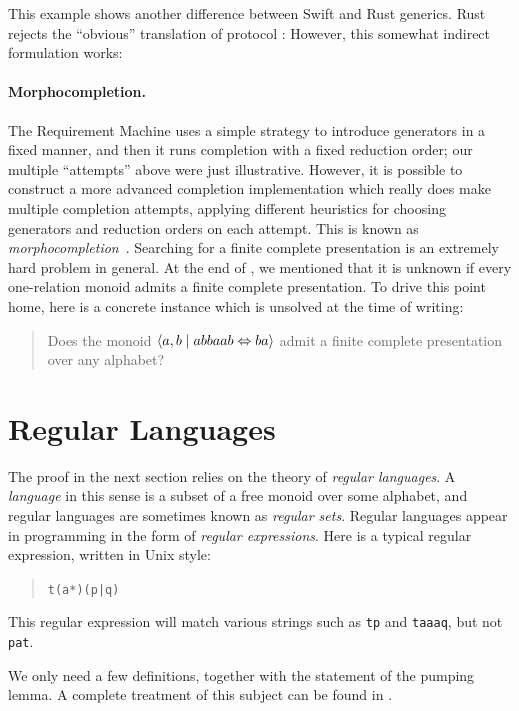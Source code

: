 \documentclass[../generics]{subfiles}
\begin{document}
\begin{example}
This example shows another difference between Swift and Rust generics. Rust rejects the ``obvious'' translation of protocol \tO:
However, this somewhat indirect formulation works:
\end{example}

\paragraph{Morphocompletion.}
The Requirement Machine uses a simple strategy to introduce generators in a fixed manner, and then it runs completion with a fixed reduction order; our multiple ``attempts'' above were just illustrative. However, it is possible to construct a more advanced completion implementation which really does make multiple completion attempts, applying different heuristics for choosing generators and reduction orders on each attempt. This is known as \emph{morphocompletion}~\cite{morph}. Searching for a finite complete presentation is an extremely hard problem in general. At the end of , we mentioned that it is unknown if every one-relation monoid admits a finite complete presentation. To drive this point home, here is a concrete instance which is unsolved at the time of writing:
\begin{quote}
Does the monoid $\langle a,b \mid abbaab \Leftrightarrow ba\rangle$ admit a finite complete presentation over any alphabet?
\end{quote}

\section{Regular Languages}\label{sec:regular languages}

The proof in the next section relies on the theory of \emph{regular languages}. A \emph{language} in this sense is a subset of a free monoid over some alphabet, and regular languages are sometimes known as \emph{regular sets}. Regular languages appear in programming in the form of \emph{regular expressions}. Here is a typical regular expression, written in Unix style:
\begin{quote}
\texttt{t(a*)(p|q)}
\end{quote}
This regular expression will match various strings such as \texttt{tp} and \texttt{taaaq}, but not \texttt{pat}.

We only need a few definitions, together with the statement of the pumping lemma. A complete treatment of this subject can be found in \cite{transductions}.
\end{document}
